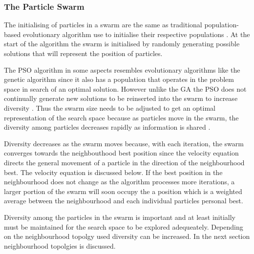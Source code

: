 \subsubsection{The Particle Swarm}
The initialising of particles in a swarm are the same as traditional population-based evolutionary algorithm use to initialise their respective populations \cite{FixedFAPPSO}.  At the start of the algorithm the swarm is initialised by randomly generating possible solutions that will represent the position of particles\cite{CompuIntelligenceIntro}. 

The PSO algorithm in some aspects resembles evolutionary algorithms like the genetic algorithm since it also has a population that operates in the problem space in search of an optimal solution. However unlike the GA the PSO does not continually generate new solutions to be reinserted into the swarm to increase diversity \cite{PSOHybridUnitCommit}. Thus the swarm size needs to be adjusted to get an optimal representation of the search space because as particles move in the swarm, the diversity among particles decreases rapidly as information is shared \cite{FundamentalSwarm,CompuIntelligenceIntro}. 

Diversity decreases as the swarm moves because, with each iteration, the swarm converges towards the neighbouthood best position\cite{PSOHybridJobShop,CompuIntelligenceIntro,FundamentalSwarm} since the velocity equation directs the general movement of a particle in the direction of the neighbourhood best\cite{PSOHybridJobShop,CompuIntelligenceIntro,FundamentalSwarm}. The velocity equation is discussed below\cite{PSOHybridJobShop,CompuIntelligenceIntro,FundamentalSwarm}. If the best position in the neighbourhood does not change as the algorithm processes more iterations, a larger portion of the swarm will soon occupy the a position which is a weighted average between the neighbourhood and each individual particles personal best\cite{PSOHybridJobShop,CompuIntelligenceIntro,FundamentalSwarm}.

Diversity among the particles in the swarm is important and at least initially must be maintained for the search space to be explored adequeately. Depending on the neighbourhood topolgy used diversity can be increased. In the next section neighbourhood topolgies is discussed.
